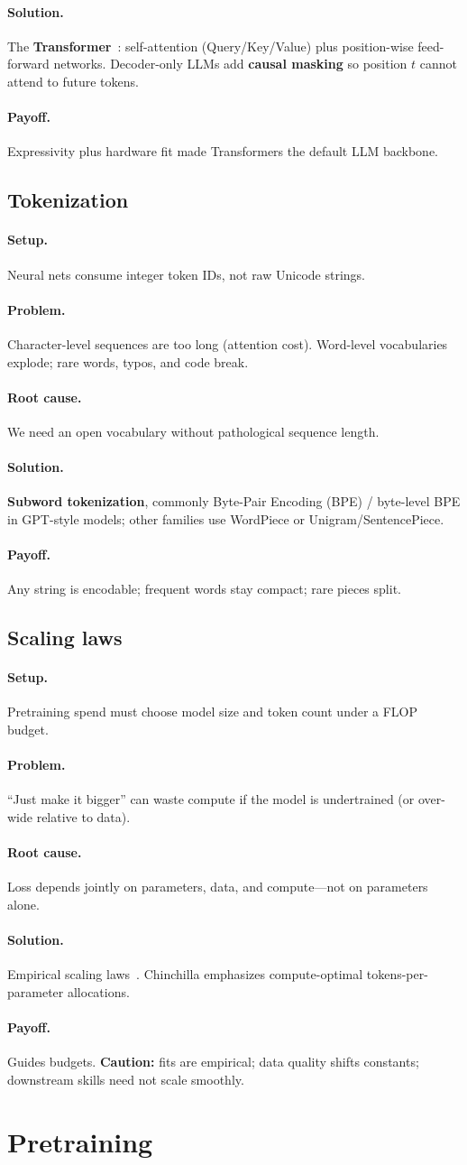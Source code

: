 \documentclass[11pt,a4paper]{article}
\newcommand{\layer}[1]{\paragraph{#1.}}
\newcommand{\setup}{\layer{Setup}}
\newcommand{\problem}{\layer{Problem}}
\newcommand{\rootcause}{\layer{Root cause}}
\newcommand{\solution}{\layer{Solution}}
\newcommand{\payoff}{\layer{Payoff}}
\begin{document}
\solution
The \textbf{Transformer}~\cite{vaswani2017attention}: self-attention (Query/Key/Value) plus position-wise feed-forward networks.
Decoder-only LLMs add \textbf{causal masking} so position \(t\) cannot attend to future tokens.

\payoff
Expressivity plus hardware fit made Transformers the default LLM backbone.

\subsection{Tokenization}
\label{sec:tok}

\setup
Neural nets consume integer token IDs, not raw Unicode strings.

\problem
Character-level sequences are too long (attention cost).
Word-level vocabularies explode; rare words, typos, and code break.

\rootcause
We need an open vocabulary without pathological sequence length.

\solution
\textbf{Subword tokenization}, commonly Byte-Pair Encoding (BPE) / byte-level BPE in GPT-style models; other families use WordPiece or Unigram/SentencePiece.

\payoff
Any string is encodable; frequent words stay compact; rare pieces split.

\subsection{Scaling laws}
\label{sec:scaling}

\setup
Pretraining spend must choose model size and token count under a FLOP budget.

\problem
``Just make it bigger'' can waste compute if the model is undertrained (or over-wide relative to data).

\rootcause
Loss depends jointly on parameters, data, and compute---not on parameters alone.

\solution
Empirical scaling laws~\cite{kaplan2020scaling,hoffmann2022chinchilla}.
Chinchilla emphasizes compute-optimal tokens-per-parameter allocations.

\payoff
Guides budgets.
\textbf{Caution:} fits are empirical; data quality shifts constants; downstream skills need not scale smoothly.

\section{Pretraining}
\label{sec:pretrain}
\end{document}
